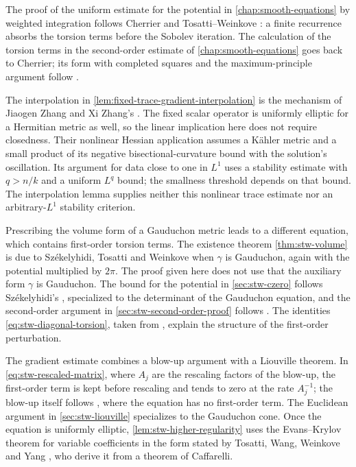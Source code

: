 The proof of the uniform estimate for the potential in \cref{chap:smooth-equations} by weighted integration follows Cherrier and Tosatti--Weinkove \cite{Cherrier87,TW10}: a finite recurrence absorbs the torsion terms before the Sobolev iteration. The calculation of the torsion terms in the second-order estimate of \cref{chap:smooth-equations} goes back to Cherrier; its form with completed squares and the maximum-principle argument follow \cite[Sections~3 and~9, pp.~133--138 and 157--160]{TW15}.

\label{hist:fixed-trace-gradient-interpolation}
The interpolation in \cref{lem:fixed-trace-gradient-interpolation} is the mechanism of Jiaogen Zhang and Xi Zhang's \cite[v1, Proposition~4.1 and its proof, p.~16]{ZhangHessianInterpolation26}. The fixed scalar operator is uniformly elliptic for a Hermitian metric as well, so the linear implication here does not require closedness. Their nonlinear Hessian application assumes a K\"ahler metric and a small product of its negative bisectional-curvature bound with the solution's oscillation. Its argument for data close to one in $L^1$ uses a stability estimate with $q>n/k$ and a uniform $L^q$ bound; the smallness threshold depends on that bound. The interpolation lemma supplies neither this nonlinear trace estimate nor an arbitrary-$L^1$ stability criterion.

Prescribing the volume form of a Gauduchon metric leads to a different equation, which contains first-order torsion terms. The existence theorem \cref{thm:stw-volume} is due to Sz{\'e}kelyhidi, Tosatti and Weinkove \cite[Theorem 1.4]{STW17} when $\gamma$ is Gauduchon, again with the potential multiplied by $2\pi$. The proof given here does not use that the auxiliary form $\gamma$ is Gauduchon. The bound for the potential in \cref{sec:stw-czero} follows Sz{\'e}kelyhidi's \cite[Propositions~10--11 and Remark~12, pp.~346--349]{Sze18}, specialized to the determinant of the Gauduchon equation, and the second-order argument in \cref{sec:stw-second-order-proof} follows \cite[Section~3]{STW17}. The identities \eqref{eq:stw-diagonal-torsion}, taken from \cite[Section~4]{STW17}, explain the structure of the first-order perturbation.

The gradient estimate combines a blow-up argument with a Liouville theorem. In \eqref{eq:stw-rescaled-matrix}, where $A_j$ are the rescaling factors of the blow-up, the first-order term is kept before rescaling and tends to zero at the rate $A_j^{-1}$; the blow-up itself follows \cite[Section~6, pp.~366--368]{Sze18}, where the equation has no first-order term. The Euclidean argument in \cref{sec:stw-liouville} specializes \cite[Theorem~20, p.~364]{Sze18} to the Gauduchon cone. Once the equation is uniformly elliptic, \cref{lem:stw-higher-regularity} uses the Evans--Krylov theorem for variable coefficients in the form stated by Tosatti, Wang, Weinkove and Yang \cite[Definition~3.2 and Theorem~3.4, pp.~444--445]{TWWY15}, who derive it from a theorem of Caffarelli.

